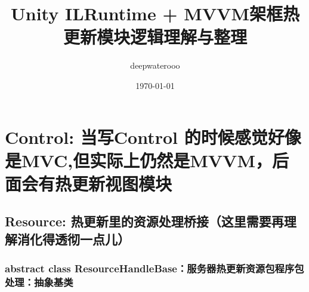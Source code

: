 \documentclass[9pt, b5paper]{article}
\author{deepwaterooo}
\date{\today}
\title{Unity ILRuntime + MVVM架框热更新模块逻辑理解与整理}
\begin{document}
\maketitle
\tableofcontents


\section{Control: 当写Control 的时候感觉好像是MVC,但实际上仍然是MVVM，后面会有热更新视图模块}
\label{sec-1}
\subsection{Resource: 热更新里的资源处理桥接（这里需要再理解消化得透彻一点儿）}
\label{sec-1-1}
\subsubsection{abstract class ResourceHandleBase：服务器热更新资源包程序包处理：抽象基类}
\label{sec-1-1-1}
\end{document}
